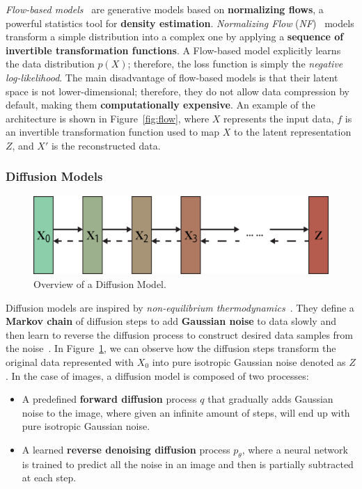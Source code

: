 \documentclass[sn-mathphys,Numbered]{sn-jnl}
\theoremstyle{thmstyleone}%
\theoremstyle{thmstyletwo}%
\theoremstyle{thmstylethree}%
\begin{document}
\emph{Flow-based models}~\cite{weng2018flow} are generative models based on \textbf{normalizing flows}, a powerful statistics tool for \textbf{density estimation}.
\emph{Normalizing Flow} (\emph{NF})~\cite{rezende2016variational} models transform a simple distribution into a complex one by applying a \textbf{sequence of invertible transformation functions}. 
A Flow-based model explicitly learns the data distribution $p(X)$; therefore, the loss function is simply the \emph{negative log-likelihood}.
The main disadvantage of flow-based models is that their latent space is not lower-dimensional;  therefore, they do not allow data compression by default, making them \textbf{computationally expensive}. An example of the architecture is shown in Figure~\ref{fig:flow}, where $X$ represents the input data, $f$ is an invertible transformation function used to map $X$ to the latent representation $Z$, and $X'$ is the reconstructed data.  


\subsubsection{Diffusion Models}\label{sec:diff}

\begin{figure}[t]
	\centering
    \includegraphics[scale=0.8]{img/svg/DIFF.png}
    \caption{Overview of a Diffusion Model.}\label{fig:diff-arch}
\end{figure}


Diffusion models are inspired by \emph{non-equilibrium thermodynamics}~\cite{V_n_2020}. 
They define a \textbf{Markov chain} of diffusion steps to add \textbf{Gaussian noise} to data slowly and then learn to reverse the diffusion process to construct desired data samples from the noise~\cite{weng2021diffusion}. 
In Figure~\ref{fig:diff-arch}, we can observe how the diffusion steps transform the original data represented with $X_0$ into pure isotropic Gaussian noise denoted as $Z$. 
In the case of images, a diffusion model is composed of two processes:

\begin{itemize}
	\item A predefined \textbf{forward diffusion} process $q$ that gradually adds Gaussian noise to the image, where given an infinite amount of steps, will end up with pure isotropic Gaussian noise. 
	\item A learned \textbf{reverse denoising diffusion} process $p_\theta$, where a neural network is trained to predict all the noise in an image and then is partially subtracted at each step.
\end{itemize}
\end{document}
